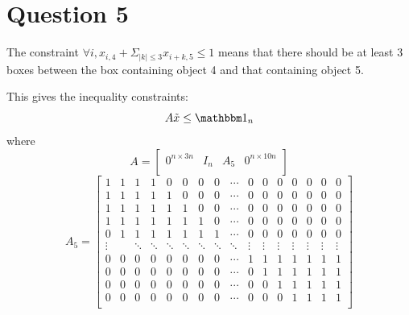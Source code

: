 \documentclass{CSArticle}[english]
\begin{document}
\section{Question 5}
\label{Q5}
The constraint $\forall i, x_{i,4}+\Sigma _{|k|\le 3}x_{i+k,5}\le 1$ means that there should be at least 3 boxes between the box containing object 4 and that containing object 5.\par
This gives the inequality constraints:
\begin{equation}
    A\tilde{x}\le \Onebb_{n}
\end{equation}
where
\begin{equation}
    A=\left[ \begin{matrix}
	0^{n\times 3n}&		I_n&		A_5&		0^{n\times 10n}\\
\end{matrix} \right] 
\end{equation}
\begin{equation}A_5=\left[\begin{matrix}
1&1&1&1&0&0&0&0&\cdots\\
1&1&1&1&1&0&0&0&\cdots\\
1&1&1&1&1&1&0&0&\cdots\\
1&1&1&1&1&1&1&0&\cdots\\
0&1&1&1&1&1&1&1&\cdots\\
\vdots& &\ddots&\ddots&\ddots&\ddots&\ddots&\ddots&\ddots\\
0&0&0&0&0&0&0&0&\cdots\\
0&0&0&0&0&0&0&0&\cdots\\
0&0&0&0&0&0&0&0&\cdots\\
0&0&0&0&0&0&0&0&\cdots\\
\end{matrix}
\begin{matrix}
0&0&0&0&0&0&0\\
0&0&0&0&0&0&0\\
0&0&0&0&0&0&0\\
0&0&0&0&0&0&0\\
0&0&0&0&0&0&0\\
\vdots&\vdots&\vdots&\vdots&\vdots&\vdots&\vdots\\
1&1&1&1&1&1&1\\
0&1&1&1&1&1&1\\
0&0&1&1&1&1&1\\
0&0&0&1&1&1&1\\
\end{matrix}\right]\end{equation}
\end{document}
